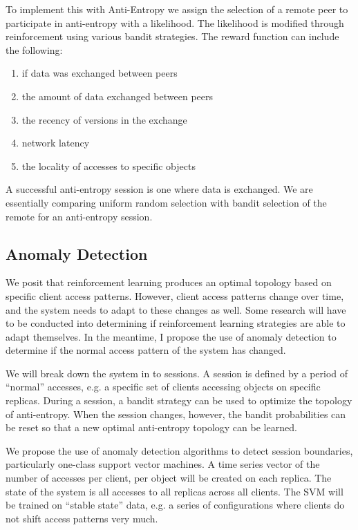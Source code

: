 \documentclass[letterpaper,11pt,onecolumn]{article}
\begin{document}
To implement this with Anti-Entropy we assign the selection of a remote peer
to participate in anti-entropy with a likelihood. The likelihood is modified
through reinforcement using various bandit strategies. The reward function
can include the following:

\begin{enumerate}
    \item if data was exchanged between peers
    \item the amount of data exchanged between peers
    \item the recency of versions in the exchange
    \item network latency
    \item the locality of accesses to specific objects
\end{enumerate}

A successful anti-entropy session is one where data is exchanged.
We are essentially comparing uniform random selection with bandit selection
of the remote for an anti-entropy session.

\subsection*{Anomaly Detection}

We posit that reinforcement learning produces an optimal topology based on
specific client access patterns.
However, client access patterns change over time, and the system needs to
adapt to these changes as well.
Some research will have to be conducted into determining if reinforcement
learning strategies are able to adapt themselves.
In the meantime, I propose the use of anomaly detection to determine if the
normal access pattern of the system has changed.

We will break down the system in to sessions.
A session is defined by a period of ``normal'' accesses, e.g. a specific set
of clients accessing objects on specific replicas.
During a session, a bandit strategy can be used to optimize the topology of
anti-entropy.
When the session changes, however, the bandit probabilities can be reset so
that a new optimal anti-entropy topology can be learned.

We propose the use of anomaly detection algorithms to detect session
boundaries, particularly one-class support vector machines.
A time series vector of the number of accesses per client, per object will
be created on each replica.
The state of the system is all accesses to all replicas across all clients.
The SVM will be trained on ``stable state'' data, e.g. a series of
configurations where clients do not shift access patterns very much.
\end{document}
